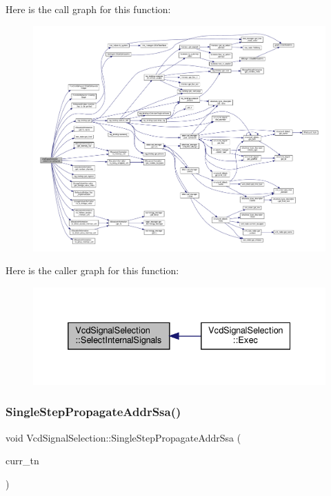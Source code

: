 Here is the call graph for this function\+:
\nopagebreak
\begin{figure}[H]
\begin{center}
\leavevmode
\includegraphics[width=350pt]{dd/de4/classVcdSignalSelection_a54478a4fe3af6bfed3b3a12e284b4d9e_cgraph}
\end{center}
\end{figure}
Here is the caller graph for this function\+:
\nopagebreak
\begin{figure}[H]
\begin{center}
\leavevmode
\includegraphics[width=332pt]{dd/de4/classVcdSignalSelection_a54478a4fe3af6bfed3b3a12e284b4d9e_icgraph}
\end{center}
\end{figure}
\mbox{\label{classVcdSignalSelection_ae525accf24ad365699762d821c108804}} 
\subsubsection{\texorpdfstring{Single\+Step\+Propagate\+Addr\+Ssa()}{SingleStepPropagateAddrSsa()}}
{\footnotesize\ttfamily void Vcd\+Signal\+Selection\+::\+Single\+Step\+Propagate\+Addr\+Ssa (\begin{DoxyParamCaption}\item[{const \hyperlink{tree__node_8hpp_a6ee377554d1c4871ad66a337eaa67fd5}{tree\+\_\+node\+Ref} \&}]{curr\+\_\+tn }\end{DoxyParamCaption})\hspace{0.3cm}{\ttfamily [protected]}}



